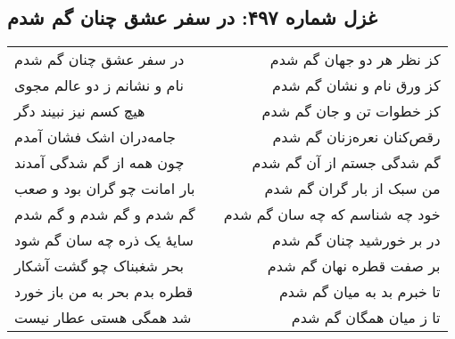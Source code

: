 \begin{center}
\section*{غزل شماره ۴۹۷: در سفر عشق چنان گم شدم}
\label{sec:497}
\begin{longtable}{l p{0.5cm} r}
در سفر عشق چنان گم شدم
&&
کز نظر هر دو جهان گم شدم
\\
نام و نشانم ز دو عالم مجوی
&&
کز ورق نام و نشان گم شدم
\\
هیچ کسم نیز نبیند دگر
&&
کز خطوات تن و جان گم شدم
\\
جامه‌دران اشک فشان آمدم
&&
رقص‌کنان نعره‌زنان گم شدم
\\
چون همه از گم شدگی آمدند
&&
گم شدگی جستم از آن گم شدم
\\
بار امانت چو گران بود و صعب
&&
من سبک از بار گران گم شدم
\\
گم شدم و گم شدم و گم شدم
&&
خود چه شناسم که چه سان گم شدم
\\
سایهٔ یک ذره چه سان گم شود
&&
در بر خورشید چنان گم شدم
\\
بحر شغبناک چو گشت آشکار
&&
بر صفت قطره نهان گم شدم
\\
قطره بدم بحر به من باز خورد
&&
تا خبرم بد به میان گم شدم
\\
شد همگی هستی عطار نیست
&&
تا ز میان همگان گم شدم
\\
\end{longtable}
\end{center}
